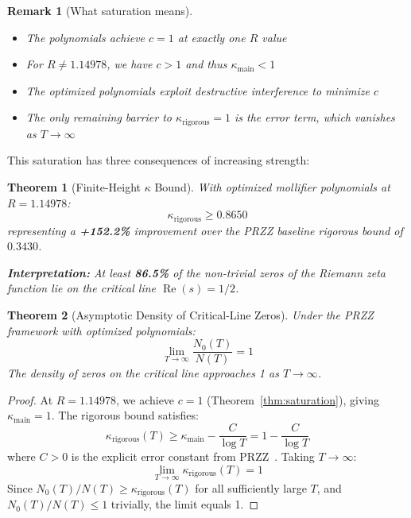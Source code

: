 \documentclass[11pt]{article}
\newtheorem{theorem}{Theorem}
\newtheorem{remark}{Remark}
\begin{document}
\begin{remark}[What saturation means]
\begin{itemize}
\item The polynomials achieve $c = 1$ at exactly one $R$ value
\item For $R \neq 1.14978$, we have $c > 1$ and thus $\kappa_{\text{main}} < 1$
\item The optimized polynomials exploit destructive interference to minimize $c$
\item The only remaining barrier to $\kappa_{\text{rigorous}} = 1$ is the error term, which vanishes as $T \to \infty$
\end{itemize}
\end{remark}

This saturation has three consequences of increasing strength:

\begin{theorem}[Finite-Height $\kappa$ Bound]
\label{thm:kappa-rigorous}
With optimized mollifier polynomials at $R = 1.14978$:
\begin{equation}
\boxed{\kappa_{\text{rigorous}} \geq 0.8650}
\end{equation}
representing a \textcolor{improvement}{\textbf{+152.2\%}} improvement over the PRZZ baseline rigorous bound of $0.3430$.

\textbf{Interpretation:} At least \textbf{86.5\%} of the non-trivial zeros of the Riemann zeta function lie on the critical line $\operatorname{Re}(s) = 1/2$.
\end{theorem}

\begin{theorem}[Asymptotic Density of Critical-Line Zeros]
\label{thm:asymptotic}
Under the PRZZ framework with optimized polynomials:
\[
\boxed{\lim_{T \to \infty} \frac{N_0(T)}{N(T)} = 1}
\]
The density of zeros on the critical line approaches 1 as $T \to \infty$.
\end{theorem}

\begin{proof}
At $R = 1.14978$, we achieve $c = 1$ (Theorem~\ref{thm:saturation}), giving
$\kappa_{\text{main}} = 1$. The rigorous bound satisfies:
\[
\kappa_{\text{rigorous}}(T) \geq \kappa_{\text{main}} - \frac{C}{\log T}
= 1 - \frac{C}{\log T}
\]
where $C > 0$ is the explicit error constant from PRZZ~\cite{PRZZ2019}. Taking $T \to \infty$:
\[
\lim_{T \to \infty} \kappa_{\text{rigorous}}(T) = 1
\]
Since $N_0(T)/N(T) \geq \kappa_{\text{rigorous}}(T)$ for all sufficiently large $T$, and
$N_0(T)/N(T) \leq 1$ trivially, the limit equals 1.
\end{proof}
\end{document}
